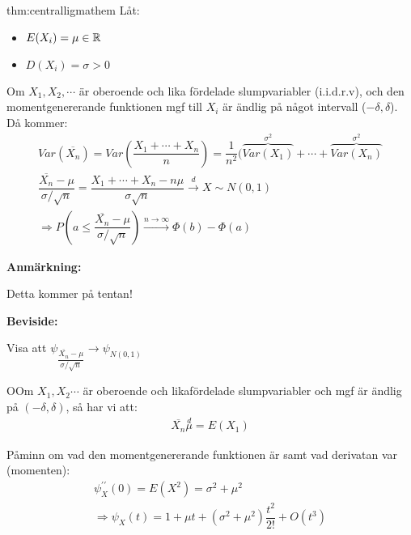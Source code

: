 \begin{theo}{thm:centralligmathem}
  Låt:\par
  \begin{itemize}
    \item $E(X_i) = \mu\in\mathbb{R}$
    \item $D(X_i) = \sigma>0$
  \end{itemize}
  \par\bigskip
  \noindent Om $X_1,X_2,\cdots$ är oberoende och lika fördelade slumpvariabler (i.i.d.r.v), och den momentgenererande funktionen mgf till $X_i$ är ändlig på något intervall ($-\delta,\delta$). Då kommer:
  \begin{equation*}
    \begin{gathered}
      Var(\overline{X_n}) = Var\left(\dfrac{X_1+\cdots+X_n}{n}\right) = \dfrac{1}{n^2}(\overbrace{Var(X_1)}^{\text{$\sigma^2$}}+\cdots+\overbrace{Var(X_n)}^{\text{$\sigma^2$}}\\
      \dfrac{\overline{X_n}-\mu}{\sigma/\sqrt{n}} = \dfrac{X_1+\cdots+X_n-n\mu}{\sigma\sqrt{n}}\stackrel{d}{\rightarrow}X\sim N(0,1)\\
      \Rightarrow P\left(a\leq\dfrac{\overline{X_n}-\mu}{\sigma/\sqrt{n}}\right)\stackrel{n\to\infty}{\rightarrow}\Phi(b)-\Phi(a)
    \end{gathered}
  \end{equation*}
\end{theo}\par
\noindent\textbf{Anmärkning:}\par
\noindent Detta kommer på tentan!
\par\bigskip
\noindent\textbf{Beviside:}\par
\noindent Visa att $\psi_{\dfrac{\overline{X_n}-\mu}{\sigma/\sqrt{n}}}\to\psi_{N(0,1)}$
\par\bigskip
\begin{theo}
  OOm $X_1,X_2\cdots$ är oberoende och likafördelade slumpvariabler och mgf är ändlig på $(-\delta,\delta)$, så har vi att:
  \begin{equation*}
    \begin{gathered}
      \overline{X_n}\stackrel{d}\mu = E(X_1)
    \end{gathered}
  \end{equation*}
\end{theo}
\par\bigskip
\noindent Påminn om vad den momentgenererande funktionen är samt vad derivatan var (momenten):
\begin{equation*}
  \begin{gathered}
    \psi_X^{\prime\prime}(0) = E(X^2) = \sigma^2+\mu^2\\
    \Rightarrow \psi_X(t) = 1+\mu t+(\sigma^2+\mu^2)\dfrac{t^2}{2!}+O(t^3)
  \end{gathered}
\end{equation*}
